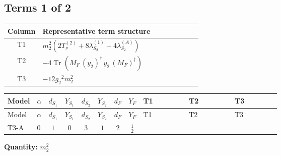 \documentclass[8pt]{article}
\begin{document}
\begin{landscape}
\subsection*{Terms 1 of 2}
\begin{center}
\begin{tabular}{@{}c >{\raggedright\arraybackslash}p{0.82\linewidth}@{}}
\toprule
Column & Representative term structure \\
\midrule
T1 & \(\displaystyle {m_2^2} (2 T_{\nu}^{(2)}+8 {\lambda_{S_2}^{(1)}}+4 {\lambda_{S_2}^{(A)}})\) \\
\midrule
T2 & \(\displaystyle -4 \operatorname{Tr}\!\left({M_F}\,\left({y_2}\right)^{\dagger}\,{y_2}\,\left({M_F}\right)^{\dagger}\right)\) \\
\midrule
T3 & \(\displaystyle -12 {g_2}^2 {m_2^2}\) \\
\midrule
\bottomrule
\end{tabular}
\end{center}
\smallskip
\tiny
\begin{longtable}{@{}llcccccc >{\raggedright\arraybackslash}p{0.21\linewidth} >{\raggedright\arraybackslash}p{0.21\linewidth} >{\raggedright\arraybackslash}p{0.21\linewidth}@{}}
\toprule
Model & $\alpha$ & $d_{S_1}$ & $Y_{S_1}$ & $d_{S_2}$ & $Y_{S_2}$ & $d_F$ & $Y_F$ & T1 & T2 & T3 \\
\midrule
\endfirsthead
\toprule
Model & $\alpha$ & $d_{S_1}$ & $Y_{S_1}$ & $d_{S_2}$ & $Y_{S_2}$ & $d_F$ & $Y_F$ & T1 & T2 & T3 \\
\midrule
\endhead
T3-A & $0$ & $1$ & $0$ & $3$ & $1$ & $2$ & $\frac{1}{2}$ & \scriptsize\adjustbox{max width=\linewidth}{$\begin{gathered} {m_2^2} (2 T_{\nu}^{(2)}+8 {\lambda_{S_2}^{(1)}}+4 {\lambda_{S_2}^{(A)}})\end{gathered}$} & \scriptsize\adjustbox{max width=\linewidth}{$\begin{gathered} -4 \operatorname{Tr}\!\left({M_F}\,\left({y_2}\right)^{\dagger}\,{y_2}\,\left({M_F}\right)^{\dagger}\right)\end{gathered}$} & \scriptsize\adjustbox{max width=\linewidth}{$\begin{gathered} -12 {g_2}^2 {m_2^2}\end{gathered}$} \\
\midrule
\bottomrule
\end{longtable}
\clearpage
\noindent\textbf{Quantity: }$m_2^2$\par\smallskip

\end{landscape}
\end{document}
